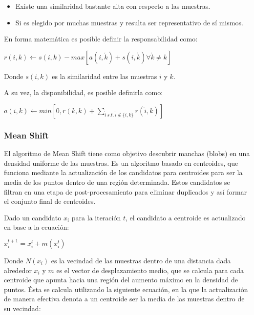 \begin{itemize}
	
	\item Existe una similaridad bastante alta con respecto a las muestras.
	
	\item Si es elegido por muchas muestras y resulta ser representativo de sí mismos.
\end{itemize}

En forma matemática es posible definir la responsabilidad como:

\begin{center}
	
	$r(i, k) \leftarrow s(i, k) - max [ a(i, \acute{k}) + s(i, \acute{k}) \forall \acute{k} \neq k ]$
\end{center}

Donde $s(i,k)$ es la similaridad entre las muestras $i$ y $k$. 

A su vez, la disponibilidad, es posible definirla como:

\begin{center}
	
	$a(i, k) \leftarrow min [0, r(k, k) + \sum_{\acute{i}~s.t.~\acute{i} \notin \{i, k\}}{r(\acute{i}, k)}]$
	
\end{center}

\subsubsection{Mean Shift}

El algoritmo de Mean Shift tiene como objetivo descubrir manchas (blobs) en una densidad uniforme de las muestras. Es un algoritmo basado en centroides, que funciona mediante la actualización de los candidatos para centroides para ser la media de los puntos dentro de una región determinada. Estos candidatos se filtran en una etapa de post-procesamiento para eliminar duplicados y así formar el conjunto final de centroides.

Dado un candidato $x_{i}$ para la iteración $t$, el candidato a centroide es actualizado en base a la ecuación:

\begin{center}
	
	$x_i^{t+1} = x_i^t + m(x_i^t)$
\end{center}

Donde $N (x_i)$ es la vecindad de las muestras dentro de una distancia dada alrededor $x_i$ y $m$ es el vector de desplazamiento medio, que se calcula para cada centroide que apunta hacia una región del aumento máximo en la densidad de puntos. Ésta se calcula utilizando la siguiente ecuación, en la que la actualización de manera efectiva denota a un centroide ser la media de las muestras dentro de su vecindad:

